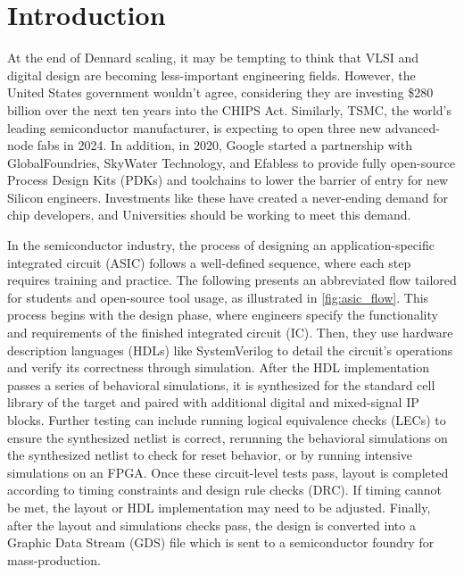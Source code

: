 
\chapter{Introduction}
\label{chapter:introduction}

At the end of Dennard scaling, it may be tempting to think that VLSI and digital design are becoming less-important engineering fields. However, the United States government wouldn't agree, considering they are investing \$280 billion over the next ten years into the CHIPS Act. \cite{mckinsey} Similarly, TSMC, the world's leading semiconductor manufacturer, is expecting to open three new advanced-node fabs in 2024. \cite{taipeitimes} In addition, in 2020, Google started a partnership with GlobalFoundries, SkyWater Technology, and Efabless to provide fully open-source Process Design Kits (PDKs) and toolchains to lower the barrier of entry for new Silicon engineers. \cite{GooglePartnersWithSkyWater, googleSilicon} Investments like these have created a never-ending demand for chip developers, and Universities should be working to meet this demand.



In the semiconductor industry, the process of designing an application-specific integrated circuit (ASIC) follows a well-defined sequence, where each step requires training and practice. \cite{intelDesignFlow, anysiliconDesignFlow, kynixDesignFlow} The following presents an abbreviated flow tailored for students and open-source tool usage, as illustrated in \autoref{fig:asic_flow}. This process begins with the design phase, where engineers specify the functionality and requirements of the finished integrated circuit (IC). Then, they use hardware description languages (HDLs) like SystemVerilog to detail the circuit's operations and verify its correctness through simulation. After the HDL implementation passes a series of behavioral simulations, it is synthesized for the standard cell library of the target and paired with additional digital and mixed-signal IP blocks. Further testing can include running logical equivalence checks (LECs) to ensure the synthesized netlist is correct, rerunning the behavioral simulations on the synthesized netlist to check for reset behavior, or by running intensive simulations on an FPGA. Once these circuit-level tests pass, layout is completed according to timing constraints and design rule checks (DRC). If timing cannot be met, the layout or HDL implementation may need to be adjusted. Finally, after the layout and simulations checks pass, the design is converted into a Graphic Data Stream (GDS) file which is sent to a semiconductor foundry for mass-production.

